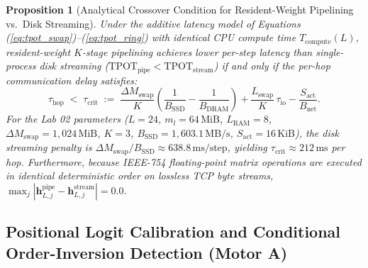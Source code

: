 \documentclass[10pt,a4paper]{article}
\newtheorem{proposition}{Proposition}
\begin{document}
\begin{proposition}[Analytical Crossover Condition for Resident-Weight Pipelining vs.\ Disk Streaming]
\label{prop:ram_dominance}
Under the additive latency model of Equations (\ref{eq:tpot_swap})--(\ref{eq:tpot_ring}) with identical CPU compute time $T_{\text{compute}}(L)$, resident-weight $K$-stage pipelining achieves lower per-step latency than single-process disk streaming ($\text{TPOT}_{\text{pipe}} < \text{TPOT}_{\text{stream}}$) if and only if the per-hop communication delay satisfies:
\begin{equation}
\label{eq:net_bound}
\tau_{\text{hop}} \;<\; \tau_{\text{crit}} \;:=\; \frac{\Delta M_{\text{swap}}}{K}\!\left(\frac{1}{B_{\text{SSD}}} - \frac{1}{B_{\text{DRAM}}}\right) + \frac{L_{\text{swap}}}{K}\,\tau_{\text{io}} - \frac{S_{\text{act}}}{B_{\text{net}}}.
\end{equation}
For the Lab 02 parameters ($L=24$, $m_l = 64\,\text{MiB}$, $L_{\text{RAM}}=8$, $\Delta M_{\text{swap}} = 1,024\,\text{MiB}$, $K=3$, $B_{\text{SSD}} = 1,603.1\,\text{MB/s}$, $S_{\text{act}} = 16\,\text{KiB}$), the disk streaming penalty is $\Delta M_{\text{swap}}/B_{\text{SSD}} \approx 638.8\,\text{ms/step}$, yielding $\tau_{\text{crit}} \approx 212\,\text{ms}$ per hop. Furthermore, because IEEE-754 floating-point matrix operations are executed in identical deterministic order on lossless TCP byte streams, $\max_j |\mathbf{h}_{L,j}^{\text{pipe}} - \mathbf{h}_{L,j}^{\text{stream}}| = 0.0$.
\end{proposition}

\subsection{Positional Logit Calibration and Conditional Order-Inversion Detection (Motor A)}
\label{sec:math_system1}
\end{document}
